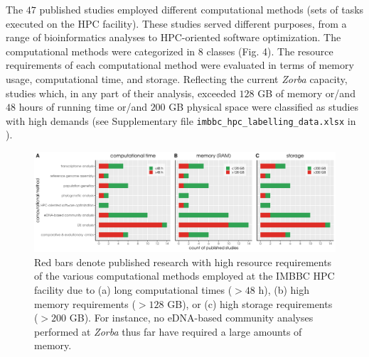    The $47$ published studies employed different computational methods (sets of tasks executed on the HPC facility). 
   These studies served different purposes, from a range of bioinformatics analyses to HPC-oriented software optimization. 
   The computational methods were categorized in $8$ classes (Fig. 4). 
   The resource requirements of each computational method were evaluated in terms of memory usage, computational time, and storage. Reflecting the current \textit{Zorba} capacity, studies which, in any part of their analysis, exceeded $128$ GB of memory or/and $48$ hours of running time or/and $200$ GB physical space were classified as studies with high demands (see Supplementary file \texttt{imbbc\_hpc\_labelling\_data.xlsx} in \citep{haris_zafeiropoulos_2021_4665308}).


   \begin{figure}
      \label{fig:resource}
      \centering
      \includegraphics[width=\columnwidth]{figures/computational_method_computational_requirement_plot.png}
      \caption[Computational resources requirements of the so-far published studies supported by the IMBBC HPC facility]{
         Red bars denote published research with high resource requirements of the various computational methods employed at the IMBBC HPC facility due to 
         (a) long computational times ($>48$ h), 
         (b) high memory requirements ($>128$ GB), or 
         (c) high storage requirements ($>200$ GB). 
         For instance, no eDNA-based community analyses performed at \textit{Zorba} thus far have required a large amounts of memory.}
   \end{figure}


